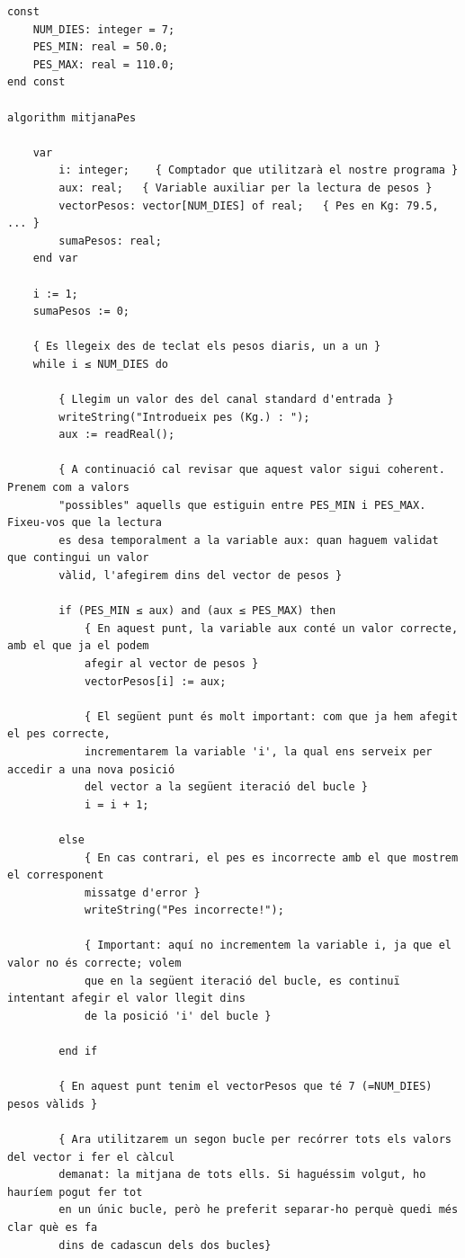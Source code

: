 \documentclass[
]{book}
\begin{document}
\begin{verbatim}
const
    NUM_DIES: integer = 7;
    PES_MIN: real = 50.0;
    PES_MAX: real = 110.0;
end const

algorithm mitjanaPes

    var
        i: integer;    { Comptador que utilitzarà el nostre programa }
        aux: real;   { Variable auxiliar per la lectura de pesos }
        vectorPesos: vector[NUM_DIES] of real;   { Pes en Kg: 79.5, ... }
        sumaPesos: real;
    end var

    i := 1;
    sumaPesos := 0;

    { Es llegeix des de teclat els pesos diaris, un a un }
    while i ≤ NUM_DIES do

        { Llegim un valor des del canal standard d'entrada }
        writeString("Introdueix pes (Kg.) : ");
        aux := readReal();

        { A continuació cal revisar que aquest valor sigui coherent. Prenem com a valors
        "possibles" aquells que estiguin entre PES_MIN i PES_MAX. Fixeu-vos que la lectura
        es desa temporalment a la variable aux: quan haguem validat que contingui un valor
        vàlid, l'afegirem dins del vector de pesos }

        if (PES_MIN ≤ aux) and (aux ≤ PES_MAX) then
            { En aquest punt, la variable aux conté un valor correcte, amb el que ja el podem
            afegir al vector de pesos }
            vectorPesos[i] := aux;

            { El següent punt és molt important: com que ja hem afegit el pes correcte,
            incrementarem la variable 'i', la qual ens serveix per accedir a una nova posició
            del vector a la següent iteració del bucle }
            i = i + 1;

        else
            { En cas contrari, el pes es incorrecte amb el que mostrem el corresponent
            missatge d'error }
            writeString("Pes incorrecte!");

            { Important: aquí no incrementem la variable i, ja que el valor no és correcte; volem
            que en la següent iteració del bucle, es continuï intentant afegir el valor llegit dins
            de la posició 'i' del bucle }

        end if

        { En aquest punt tenim el vectorPesos que té 7 (=NUM_DIES) pesos vàlids }

        { Ara utilitzarem un segon bucle per recórrer tots els valors del vector i fer el càlcul
        demanat: la mitjana de tots ells. Si haguéssim volgut, ho hauríem pogut fer tot
        en un únic bucle, però he preferit separar-ho perquè quedi més clar què es fa
        dins de cadascun dels dos bucles}


\end{verbatim}
\end{document}
